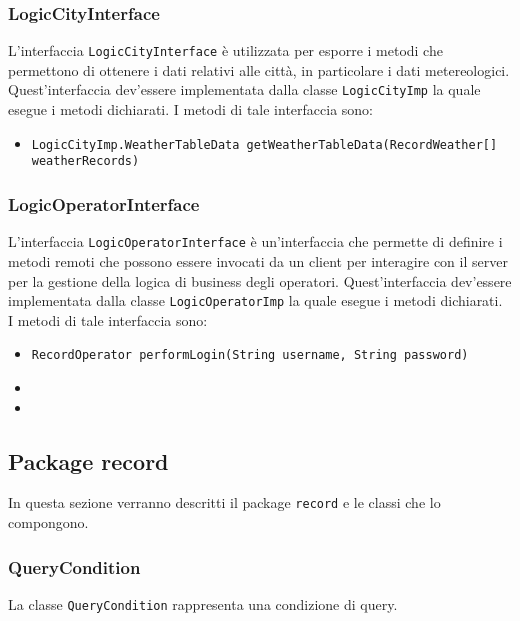 \subsubsection{LogicCityInterface}
L'interfaccia \texttt{LogicCityInterface} è utilizzata per esporre i metodi che permettono di ottenere i dati relativi alle città, in particolare i dati metereologici.
Quest'interfaccia dev'essere implementata dalla classe \texttt{LogicCityImp} la quale esegue i metodi dichiarati.
I metodi di tale interfaccia sono:
\begin{itemize}
\item \texttt{LogicCityImp.WeatherTableData getWeatherTableData(RecordWeather[] weatherRecords)}
\end{itemize}

\subsubsection{LogicOperatorInterface}
L'interfaccia \texttt{LogicOperatorInterface} è un'interfaccia che permette di definire i metodi remoti che possono essere invocati da un client per interagire con il server per la gestione della logica di business degli operatori.
Quest'interfaccia dev'essere implementata dalla classe \texttt{LogicOperatorImp} la quale esegue i metodi dichiarati.
I metodi di tale interfaccia sono:
\begin{itemize}
\item \texttt{RecordOperator performLogin(String username, String password)}
\item {}
\item {}
\end{itemize}

\subsection{Package record} 
In questa sezione verranno descritti il package \texttt{record} e le classi che lo compongono.\\

\subsubsection{QueryCondition}
La classe \texttt{QueryCondition} rappresenta una condizione di query.

